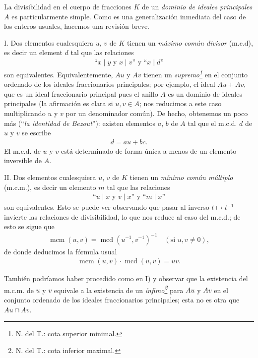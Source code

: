 \documentclass[bibtotoc,leqno,spanish]{amsbook}
\DeclareMathOperator{\mcm}{mcm}
\DeclareMathOperator{\mcd}{mcd}
\numberwithin{equation}{section}
\theoremstyle{note}
\theoremstyle{note}
\theoremstyle{rem}
\numberwithin{theorem}{section}
\numberwithin{proposition}{section}
\numberwithin{definition}{section}
\numberwithin{lemma}{section}
\numberwithin{corollary}{section}
\numberwithin{example}{section}
\numberwithin{footnote}{section}%
\begin{document}
La divisibilidad en el cuerpo de fracciones $K$ de un \emph{dominio de ideales
principales} $A$ es particularmente simple. Como es una generalizaci\'on
inmediata del caso de los enteros usuales, hacemos una revisi\'on breve.

\setcounter{equation}{0}

\begin{trivlist}\setlength{\itemindent}{\parindent}
\item {I.} Dos elementos cualesquiera $u$, $v$ de $K$ tienen un \emph{m\'aximo com\'un divisor}
(m.c.d), es decir un element $d$ tal que las relaciones
\begin{gather}
\text{``$x\mid y$ y $x\mid v$'' y ``$x\mid d$''}
\end{gather}
son equivalentes. Equivalentemente, $Au$ y $Av$ tienen un \emph{supremo\footnote{N. del T.: cota superior minimal.}} en el
conjunto ordenado de los ideales fraccionarios principales; por ejemplo, el ideal
$Au+Av$, que es un ideal fraccionario principal pues el anillo $A$ es un dominio de
ideales principales (la afirmaci\'on es clara si $u, v\in A$; nos reducimos a este
caso multiplicando $u$ y $v$ por un denominador com\'un). De hecho, obtenemos un poco
m\'as (``\emph{la identidad de Bezout}''): existen elementos $a$, $b$ de $A$ tal que
el m.c.d. $d$ de $u$ y $v$ se escribe
\begin{gather}\label{eq-1.1-2}
d = au+bc.
\end{gather}
El m.c.d. de $u$ y $v$ est\'a determinado de forma \'unica a menos de un elemento
inversible de $A$.

\item {II.} Dos elementos cualesquiera $u$, $v$ de $K$ tienen
un {\em m\'inimo com\'un m\'ultiplo}
(m.c.m.), es decir un elemento $m$ tal que las relaciones
\begin{gather}
\text{``$u\mid x$ y $v\mid x$'' y ``$m\mid x$''}
\end{gather}
son equivalentes. Esto se puede ver observando que pasar al inverso $t\mapsto t^{-1}$
invierte las relaciones de divisibilidad, lo que nos reduce al caso del m.c.d.; de esto
se sigue que
\begin{gather}
\mcm(u,v) = \mcd(u^{-1},v^{-1})^{-1}\quad (\text{si $u,v\neq 0$}),
\end{gather}
de donde deducimos la f\'ormula usual
\begin{gather}
\mcm(u,v)\cdot\mcd(u,v) = uv.
\end{gather}

Tambi\'en podr\'iamos haber procedido como en I) y observar que la existencia del
m.c.m. de $u$ y $v$ equivale a la existencia de un
{\em \'infimo\footnote{N. del T.: cota inferior maximal.}} para $Au$ y
$Av$ en el conjunto ordenado de los ideales fraccionarios principales; esta no es
otra que $Au\cap Av$.


\end{trivlist}
\end{document}
